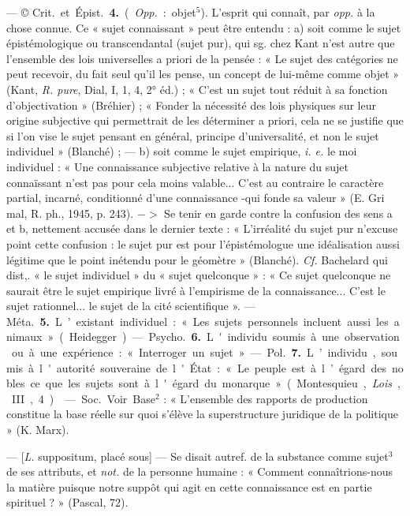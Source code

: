 \begin{itemize}[leftmargin=1cm, label=, itemsep=1pt]
— © \si{Crit.} et \si{Épist.} {\bf 4.} ({\it Opp.} :
objet$^5$). L'esprit qui connaît, par
{\it opp.} à la chose connue. Ce « sujet
connaissant » peut être entendu :
a) soit comme le sujet épistémologique ou transcendantal (sujet pur),
qui sg. chez Kant n’est autre que
l’ensemble des lois universelles a
priori de la pensée : « Le sujet des
catégories ne peut recevoir, du fait
seul qu'il les pense, un concept de
lui-même comme objet » (Kant,
{\it R. pure}, Dial, I, 1, 4, 2° éd.) ;
« C’est un sujet tout réduit à sa
fonction d’objectivation » (Bréhier) ;
« Fonder la nécessité des lois physiques sur leur origine subjective
qui permettrait de les déterminer
a priori, cela ne se justifie que si l'on
vise le sujet pensant en général,
principe d'universalité, et non le
sujet individuel » (Blanché) ; —
b) soit comme le sujet empirique,
{\it i. e.} le moi individuel : « Une connaissance subjective relative à la
nature du sujet connaïssant n’est
pas pour cela moins valable... C'est
au contraire le caractère partial,
incarné, conditionné d’une connaissance -qui fonde sa valeur » (E. Gri
mal, R. ph., 1945, p. 243). $->$ Se
tenir en garde contre la confusion
des sens a et b, nettement accusée
dans le dernier texte : « L’irréalité
du sujet pur n’excuse point cette
confusion : le sujet pur est pour
l’épistémologue une idéalisation
aussi légitime que le point inétendu
pour le géomètre » (Blanché). {\it Cf.}
Bachelard qui dist,. « le sujet individuel » du « sujet quelconque » :
« Ce sujet quelconque ne saurait
être le sujet empirique livré à l’empirisme de la connaissance... C'est le
sujet rationnel... le sujet de la cité
scientifique ». — \si{Méta.} {\bf 5.} L’existant
individuel : « Les sujets personnels
incluent aussi les animaux » (Heidegger).

— \si{Psycho.} {\bf 6.} L'individu soumis
à une observation ou à une expérience : « Interroger un sujet. »

— \si{Pol.} {\bf 7.} L’individu, soumis à
l'autorité souveraine de l'État : « Le
peuple est à l’égard des nobles ce
que les sujets sont à l'égard du
monarque » (Montesquieu, {\it Lois},
III, 4).

 — \si{Soc.} Voir Base$^2$ :
« L'ensemble des rapports de production constitue la base réelle sur
quoi s'élève la superstructure juridique de la politique » (K. Marx).

 — [{\it L.} suppositum, placé sous] —
Se disait autref. de la substance
comme sujet$^3$ de ses attributs, et
{\it not.} de la personne humaine : « Comment connaîtrions-nous la matière
puisque notre suppôt qui agit en
cette connaissance est en partie spirituel ? » (Pascal, 72).


\end{itemize}
